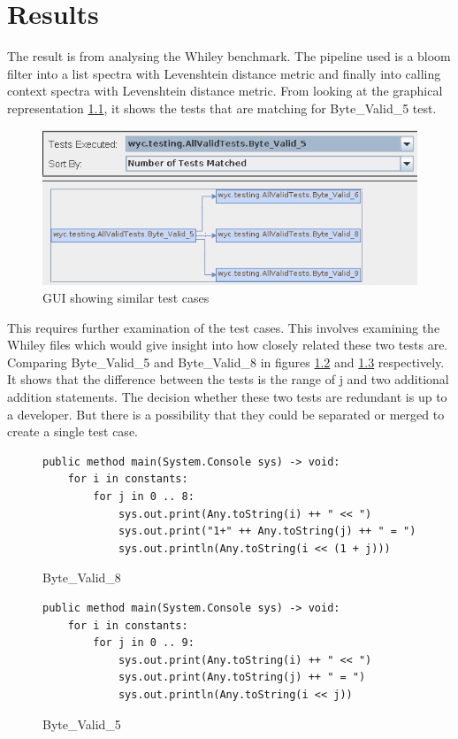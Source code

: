 \chapter{Results}\label{C:results}

The result is from analysing the Whiley benchmark. The pipeline used is a bloom filter into a list spectra with Levenshtein distance metric and finally into calling context spectra with Levenshtein distance metric. From looking at the graphical representation \ref{fig:similiartests}, it shows the tests that are matching for Byte\_Valid\_5 test.

\begin{figure}[h]
\caption{GUI showing similar test cases}
\label{fig:similiartests}
\includegraphics[width=\textwidth]{model24.png}
\end{figure}

This requires further examination of the test cases. This involves examining the Whiley files which would give insight into how closely related these two tests are. Comparing Byte\_Valid\_5 and Byte\_Valid\_8 in figures \ref{fig:byte8} and \ref{fig:byte5} respectively. It shows that the difference between the tests is the range of j and two additional addition statements. The decision whether these two tests are redundant is up to a developer. But there is a possibility that they could be separated or merged to create a single test case.

\begin{figure}[h]
\caption{Byte\_Valid\_8}
\begin{lstlisting}
public method main(System.Console sys) -> void:
    for i in constants:
        for j in 0 .. 8:
            sys.out.print(Any.toString(i) ++ " << ")
            sys.out.print("1+" ++ Any.toString(j) ++ " = ")
            sys.out.println(Any.toString(i << (1 + j)))
\end{lstlisting}
\label{fig:byte8}
\end{figure}

\begin{figure}[h]
\caption{Byte\_Valid\_5}
\begin{lstlisting}
public method main(System.Console sys) -> void:
    for i in constants:
        for j in 0 .. 9:
            sys.out.print(Any.toString(i) ++ " << ")
            sys.out.print(Any.toString(j) ++ " = ")
            sys.out.println(Any.toString(i << j))
\end{lstlisting}
\label{fig:byte5}
\end{figure}